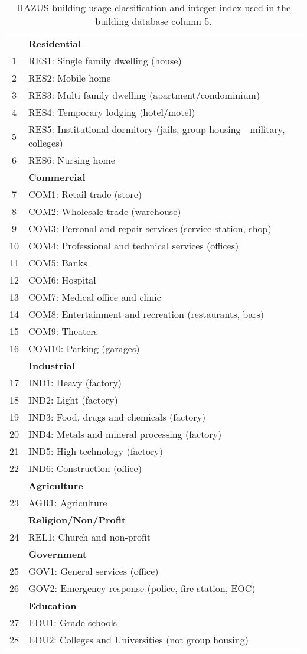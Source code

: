 \begin{table}
\centering \caption{HAZUS building usage
classification \citep{dr_FEMA99b} and
integer index used in the building database column 5.} \label{tab:grids-HAZUSusage} \vspace{0.8em}
\begin{tabular}{|c|p{}|}
\hline
& \textbf{Residential}\\
1 & RES1: Single family dwelling (house)\\
2 & RES2: Mobile home\\
3 & RES3: Multi family dwelling (apartment/condominium) \\
4 & RES4: Temporary lodging (hotel/motel)\\
5 & RES5: Institutional dormitory (jails, group housing - military, colleges)\\
6 & RES6: Nursing home\\
\hline
& \textbf{Commercial}\\
7 & COM1: Retail trade (store)\\
8 & COM2: Wholesale trade (warehouse)\\
9 & COM3: Personal and repair services (service station, shop)\\
10 & COM4: Professional and technical services (offices)\\
11 & COM5: Banks\\
12 & COM6: Hospital\\
13 & COM7: Medical office and clinic\\
14 & COM8: Entertainment and recreation (restaurants, bars)\\
15 & COM9: Theaters\\
16 & COM10: Parking (garages)\\
\hline
& \textbf{Industrial}\\
17 & IND1: Heavy (factory)\\
18 & IND2: Light (factory)\\
19 & IND3: Food, drugs and chemicals (factory)\\
20 & IND4: Metals and mineral processing (factory)\\
21 & IND5: High technology (factory)\\
22 & IND6: Construction (office)\\
\hline
& \textbf{Agriculture}\\
23 & AGR1: Agriculture\\
\hline
& \textbf{Religion/Non/Profit}\\
24 & REL1: Church and non-profit\\
\hline
& \textbf{Government}\\
25 & GOV1: General services (office)\\
26 & GOV2: Emergency response (police, fire station, EOC)\\
\hline
& \textbf{Education}\\
27 & EDU1: Grade schools\\
28 & EDU2: Colleges and Universities (not group housing)\\
\hline
\end{tabular}
\end{table}

